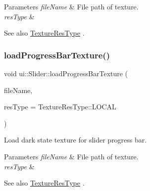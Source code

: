 \begin{DoxyParams}{Parameters}
{\em file\+Name} & File path of texture. \\
\hline
{\em res\+Type} & \\
\hline
\end{DoxyParams}
\begin{DoxySeeAlso}{See also}
\hyperlink{classui_1_1Widget_a040a65ec5ad3b11119b7e16b98bd9af0}{Texture\+Res\+Type} . 
\end{DoxySeeAlso}
\mbox{\label{classui_1_1Slider_a7d4ee10a1661d3ca873288b92600dc54}} 
\subsubsection{\texorpdfstring{load\+Progress\+Bar\+Texture()}{loadProgressBarTexture()}\hspace{0.1cm}{\footnotesize\ttfamily [2/2]}}
{\footnotesize\ttfamily void ui\+::\+Slider\+::load\+Progress\+Bar\+Texture (\begin{DoxyParamCaption}\item[{const std\+::string \&}]{file\+Name,  }\item[{\hyperlink{classui_1_1Widget_a040a65ec5ad3b11119b7e16b98bd9af0}{Texture\+Res\+Type}}]{res\+Type = {\ttfamily TextureResType\+:\+:LOCAL} }\end{DoxyParamCaption})}

Load dark state texture for slider progress bar.


\begin{DoxyParams}{Parameters}
{\em file\+Name} & File path of texture. \\
\hline
{\em res\+Type} & \\
\hline
\end{DoxyParams}
\begin{DoxySeeAlso}{See also}
\hyperlink{classui_1_1Widget_a040a65ec5ad3b11119b7e16b98bd9af0}{Texture\+Res\+Type} . 
\end{DoxySeeAlso}
\mbox{\label{classui_1_1Slider_a6d4531a15ed308e060d681ef99d97ce0}} 
